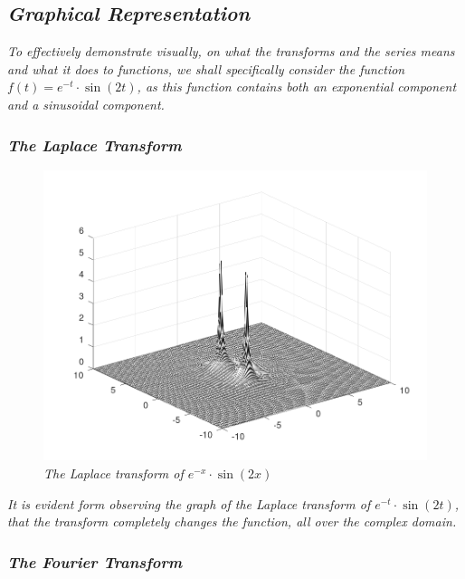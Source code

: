 

\subsection{\textit{Graphical Representation}}

	\textit{To effectively demonstrate visually, on what the transforms and the series means and what it does to functions, we shall specifically consider the function $f(t) = e^{-t}\cdot\sin\left(2t\right)$, as this function contains both an exponential component and a sinusoidal component.}

	\subsubsection{\textit{The Laplace Transform}}


			\begin{figure}[H]
			\centering
			\includegraphics[width=15cm]{LapPictures/bk.png}
    		\caption{\textit{The Laplace transform of $e^{-x}\cdot\sin\left(2x\right)$}}
			\end{figure}

		\textit{It is evident form observing the graph of the Laplace transform of $e^{-t}\cdot\sin\left(2t\right)$, that the transform completely changes the function, all over the complex domain.}

	\subsubsection{\textit{The Fourier Transform}}

